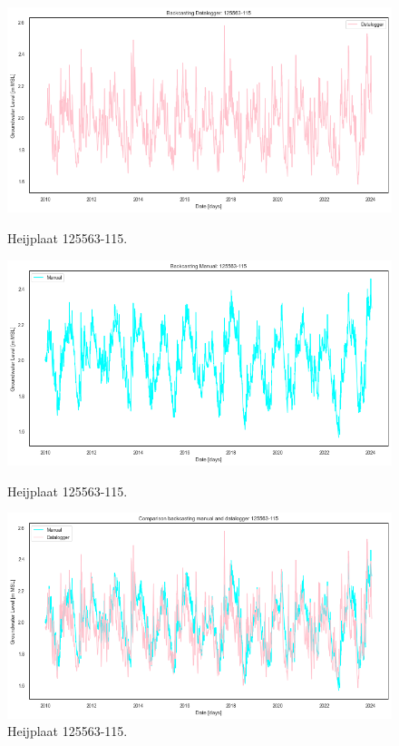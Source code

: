 \begin{figure}[htbp]
    \centering
    \begin{minipage}{0.32\textwidth}
        \centering
        \includegraphics[width=\linewidth]{figures/res heij/dl1125663115.png}
        \caption{Heijplaat 125563-115.}
        \label{fig:fig1}
    \end{minipage}
    \hfill
    \begin{minipage}{0.32\textwidth}
        \centering
        \includegraphics[width=\linewidth]{figures/res heij/hp125563115.png}
        \caption{Heijplaat 125563-115.}
        \label{fig:fig2}
    \end{minipage}
    \hfill
    \begin{minipage}{0.32\textwidth}
        \centering
        \includegraphics[width=\linewidth]{figures/res heij/comb125563115.png}
        \caption{Heijplaat 125563-115.}
        \label{fig:fig3}
    \end{minipage}
\end{figure}

